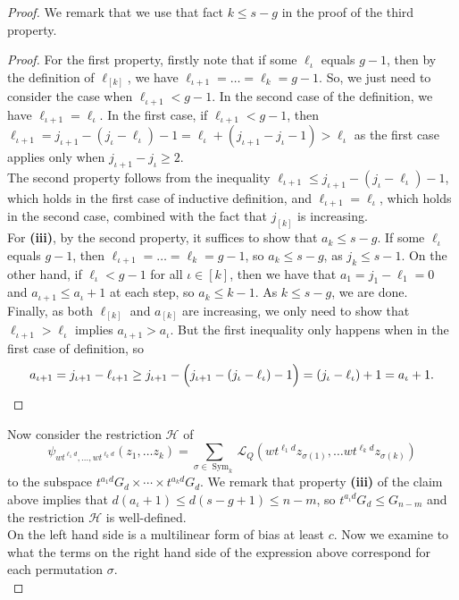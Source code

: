 \documentclass[a4paper,11pt]{article}
\theoremstyle{definition}
\newcommand{\on}[1]{
	\operatorname{#1}
}
\begin{document}
\begin{proof}
We remark that we use that fact $k \leq s - g$ in the proof of the third property.

\begin{proof}
    For the first property, firstly note that if some $\ell_\iota$ equals $g-1$, then by the definition of $\ell_{[k]}$, we have $\ell_{\iota + 1} = \dots = \ell_k = g - 1$. So, we just need to consider the case when $\ell_{\iota + 1} < g - 1$. In the second case of the definition, we have $\ell_{\iota+1}= \ell_\iota$. In the first case, if $\ell_{\iota + 1} < g - 1$, then $\ell_{\iota+1}=j_{\iota+1}-(j_\iota - \ell_\iota) - 1 = \ell_\iota + (j_{\iota+1}-j_\iota -1) > \ell_\iota $ as the first case applies only when $j_{\iota+1}-j_\iota \geq 2$.\\
    \indent The second property follows from the inequality $\ell_{\iota + 1} \leq j_{\iota+1}-(j_\iota - \ell_\iota) - 1$, which holds in the first case of inductive definition, and $\ell_{\iota +1} = \ell_\iota$, which holds in the second case, combined with the fact that $j_{[k]}$ is increasing.\\
    \indent For \textbf{(iii)}, by the second property, it suffices to show that $a_k \leq s - g$. If some $\ell_\iota$ equals $g-1$, then $\ell_{\iota + 1} = \dots = \ell_k = g-1$, so $a_k \leq s-g$, as $j_k \leq s- 1$. On the other hand, if $\ell_\iota < g-1$ for all $\iota \in [k]$, then we have that $a_1 = j_1 - \ell_1 = 0$ and $a_{\iota + 1} \leq a_{\iota} + 1$ at each step, so $a_k \leq k-1$. As $k \leq s-g$, we are done.\\
    \indent Finally, as both $\ell_{[k]}$ and $a_{[k]}$ are increasing, we only need to show that $\ell_{\iota + 1} > \ell_{\iota}$ implies $a_{\iota + 1} > a_{\iota}$. But the first inequality only happens when in the first case of definition, so
    \[a_{\iota + 1} = j_{\iota + 1} - \ell_{\iota + 1} \geq j_{\iota+1} - \Big( j_{\iota+1}-(j_\iota - \ell_\iota) - 1\Big) = (j_\iota - \ell_\iota) + 1 = a_\iota + 1.\qedhere\]
\end{proof}

\vspace{\baselineskip}

Now consider the restriction $\mathcal{H}$ of 
\[
\psi_{wt^{\ell_1d},\ldots ,wt^{\ell_kd}}(z_1,\ldots z_k)=\sum_{\sigma \in \on{Sym}_k} \mathcal{L}_Q(wt^{\ell_1d}z_{\sigma(1)},\ldots wt^{\ell_kd}z_{\sigma(k)})
\]
to the subspace $t^{a_1d}G_d\times \cdots \times t^{a_kd}G_d$. We remark that property \textbf{(iii)} of the claim above implies that $d(a_\iota + 1)\leq d(s - g + 1) \leq n-m$, so $t^{a_\iota d}G_d \leq G_{n-m}$ and the restriction $\mathcal{H}$ is well-defined.\\
\indent On the left hand side is a multilinear form of bias at least $c$. Now we examine to what the terms on the right hand side of the expression above correspond for each permutation $\sigma$.\\


\end{proof}
\end{document}
